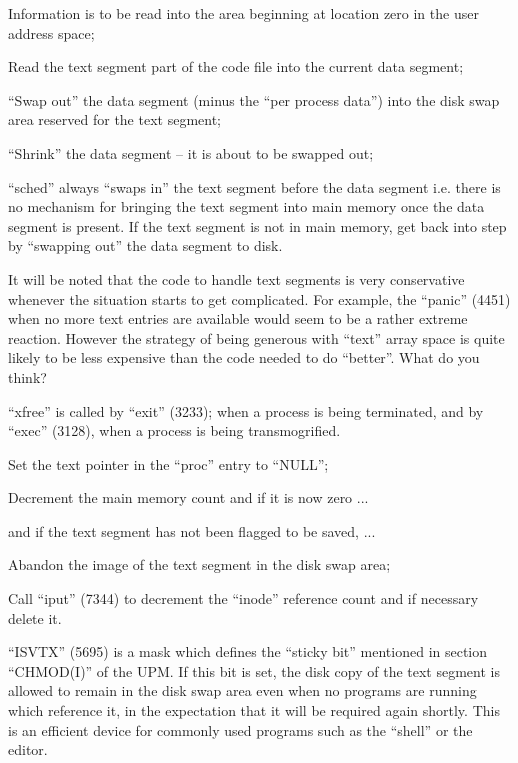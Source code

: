 \item[4463:] Information is to be read into
the area beginning at location
zero in the user address space;

\item[4464:] Read the text segment part of the
code file into the current data
segment;

\item[4467:] ``Swap out'' the data segment
(minus the ``per process data'')
into the disk swap area reserved
for the text segment;

\item[4473:] ``Shrink'' the data segment -- it is
 about to be swapped out;

\item[4475:] ``sched'' always ``swaps in'' the
 text segment before the data segment i.e. there is no mechanism
 for bringing the text segment
 into main memory once the data
 segment is present. If the text
segment is not in main memory,
get back into step by ``swapping
out'' the data segment to disk.
\ed

It will be noted that the code to handle text segments is very conservative
whenever the situation starts to get
complicated. For example, the ``panic''
(4451) when no more text entries are
available would seem to be a rather
extreme reaction. However the strategy
of being generous with ``text'' array
space is quite likely to be less expensive than the code needed to do
``better''. What do you think?



``xfree'' is called by ``exit'' (3233);
when a process is being terminated, and
by ``exec'' (3128), when a process is
being transmogrified.

\bd
\item[4402:] Set the text pointer in the
 ``proc'' entry to ``NULL'';

\item[4403:] Decrement the main memory count
 and if it is now zero ...

\item[4406:] and if the text segment has not
 been flagged to be saved, ...

\item[4408:] Abandon the image of the text
 segment in the disk swap area;

\item[4411:] Call ``iput'' (7344) to decrement
 the ``inode'' reference count and
 if necessary delete it.
\ed


``ISVTX'' (5695) is a mask which defines
the ``sticky bit'' mentioned in section
``CHMOD(I)'' of the UPM. If this bit is
set, the disk copy of the text segment
is allowed to remain in the disk swap
area even when no programs are running
which reference it, in the expectation
that it will be required again shortly.
This is an efficient device for commonly used programs such as the ``shell''
or the editor.
